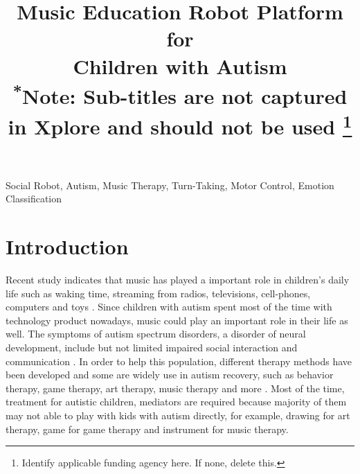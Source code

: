 \documentclass[conference]{IEEEtran}
\begin{document}
\title{Music Education Robot Platform for \\Children with Autism\\
{\footnotesize \textsuperscript{*}Note: Sub-titles are not captured in Xplore and
should not be used}
\thanks{Identify applicable funding agency here. If none, delete this.}
}

\author{
\and
{}

}

\maketitle

\begin{abstract}

\end{abstract}

\begin{IEEEkeywords}
Social Robot, Autism, Music Therapy, Turn-Taking, Motor Control, Emotion Classification
\end{IEEEkeywords}


\section{Introduction}
Recent study indicates that music has played a important role in children's daily life such as 
waking time, streaming from radios, televisions, cell-phones, computers and 
toys \cite{young2007toward}. Since children with autism spent most of the time with 
technology product nowadays, music could play an important role in their life as well.
The symptoms of autism spectrum disorders, a disorder of neural development, include but not 
limited impaired social interaction and communication \cite{rapin2008autism}. In order to help
this population, different therapy methods have been developed and some are widely use in autism
recovery, such as behavior therapy, game therapy, art therapy, music therapy and more \cite{bryson2003autism}. 
Most of the time, treatment for autistic children, mediators are required because majority of them
may not able to play with kids with autism directly, for example, drawing for art therapy, game 
for game therapy and instrument for music therapy. 
\end{document}
